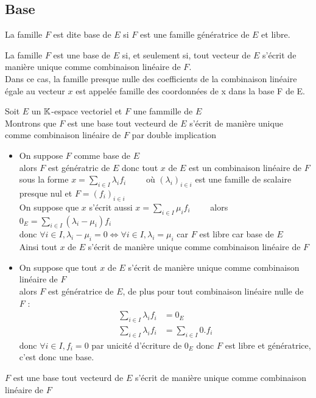\subsection{Base}
\begin{defi}
    La famille \(F\) est dite base de \(E\) si \(F\) est une famille génératrice de \(E\) et libre.
\end{defi}
\begin{defprop}[Caractérisation]
    La famille \(F\) est une base de \(E\) si, et seulement si, tout vecteur de \(E\) s’écrit de manière unique comme combinaison linéaire de \(F\).\\
    Dans ce cas, la famille presque nulle des coefficients de la combinaison linéaire égale au vecteur \(x\) est appelée famille des coordonnées de x dans la base F de E.
\end{defprop}
\begin{dem}
    Soit \(E\) un \(\mathbb{K}\)-espace vectoriel et \(F\) une fammille de \(E\) \\
    Montrons que \(F\) est une base \ssi tout vecteurd de \(E\) s'écrit de manière unique comme combinaison linéaire de \(F\) par double implication 
    \begin{itemize}
       \item \impdir On suppose \(F\) comme base de \(E\)\\
       alors \(F\) est génératric de \(E\) donc tout \(x\) de \(E\) est un combinaison linéaire de \(F\) sous la forme \(x = \sum_{i \in I} \lambda_i f_i\qquad\) où \((\lambda_i)_{i \in i}\) est une famille de scalaire presque nul et \(F =(f_i)_{i \in i}\)\\
       On suppose que \(x\) s'écrit aussi \(x =\sum_{i \in I} \mu_i f_i \qquad\)  alors \(0_E = \sum_{i \in I}(\lambda_i - \mu_i)f_i\) \\
       donc \(\forall i \in I, \lambda_i-\mu_i = 0 \iff \forall i \in I, \lambda_i = \mu_i \) car \(F\) est libre car base de \(E\)\\
       Ainsi tout \(x\) de \(E\) s'écrit de manière unique comme combinaison linéaire de \(F\)
       \item \imprec On suppose que tout \(x\) de \(E\) s'écrit de manière unique comme combinaison linéaire de \(F\) \\
       alors \(F\) est génératrice de \(E\), de plus pour tout combinaison linéaire nulle de \(F\) : 
       \begin{align}
        \sum_{i\in I} \lambda_i f_i &= 0_E \\
        \sum_{i\in I} \lambda_i f_i &= \sum_{i\in I} 0.f_i
       \end{align}
       donc \(\forall i \in I,f_i = 0\) par unicité d'écriture de \(0_E\) donc \(F\) est libre et génératrice, c'est donc une base.
    \end{itemize}
    \conclusion \(F\) est une base \ssi tout vecteurd de \(E\) s'écrit de manière unique comme combinaison linéaire de \(F\)
\end{dem}
